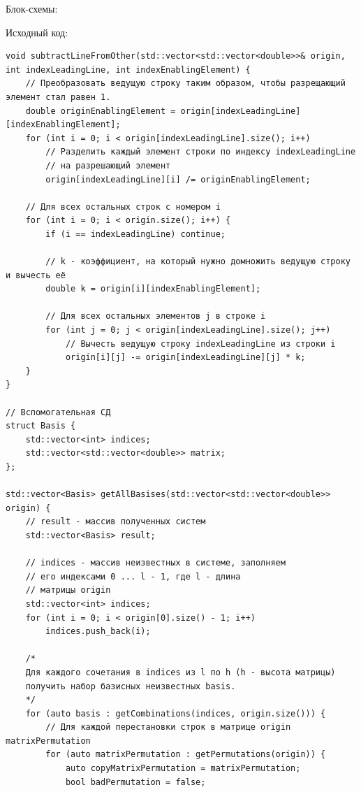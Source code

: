 \documentclass[a4paper,14pt]{extarticle}
\begin{document}
Блок-схемы:
\begin{center}
    
    
\end{center}
Исходный код:
\begin{verbatim}
void subtractLineFromOther(std::vector<std::vector<double>>& origin, int indexLeadingLine, int indexEnablingElement) {
    // Преобразовать ведущую строку таким образом, чтобы разрещающий элемент стал равен 1.
    double originEnablingElement = origin[indexLeadingLine][indexEnablingElement];
    for (int i = 0; i < origin[indexLeadingLine].size(); i++) 
        // Разделить каждый элемент строки по индексу indexLeadingLine
        // на разрешающий элемент
        origin[indexLeadingLine][i] /= originEnablingElement;
    
    // Для всех остальных строк с номером i
    for (int i = 0; i < origin.size(); i++) {
        if (i == indexLeadingLine) continue;

        // k - коэффициент, на который нужно домножить ведущую строку и вычесть её
        double k = origin[i][indexEnablingElement];

        // Для всех остальных элементов j в строке i
        for (int j = 0; j < origin[indexLeadingLine].size(); j++)
            // Вычесть ведущую строку indexLeadingLine из строки i
            origin[i][j] -= origin[indexLeadingLine][j] * k;
    }
}

// Вспомогательная СД
struct Basis {
    std::vector<int> indices;
    std::vector<std::vector<double>> matrix;
};

std::vector<Basis> getAllBasises(std::vector<std::vector<double>> origin) {
    // result - массив полученных систем 
    std::vector<Basis> result;

    // indices - массив неизвестных в системе, заполняем
    // его индексами 0 ... l - 1, где l - длина 
    // матрицы origin
    std::vector<int> indices;
    for (int i = 0; i < origin[0].size() - 1; i++) 
        indices.push_back(i);
    
    /*
    Для каждого сочетания в indices из l по h (h - высота матрицы) 
    получить набор базисных неизвестных basis.
    */
    for (auto basis : getCombinations(indices, origin.size())) {
        // Для каждой перестановки строк в матрице origin matrixPermutation
        for (auto matrixPermutation : getPermutations(origin)) {
            auto copyMatrixPermutation = matrixPermutation;
            bool badPermutation = false;
            

\end{verbatim}
\end{document}
